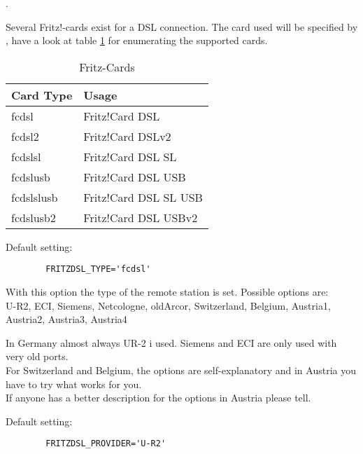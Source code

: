 \begin{description}
  
  .


Several Fritz!-cards exist for a DSL connection. 
The card used will be specified by
, have a look at table
\ref{tab:fritz-karten} for enumerating the supported cards.

\begin{table}[htb]
  \centering
  \begin{tabular}{l|l}
    Card Type & Usage \\
    \hline
    fcdsl & Fritz!Card DSL \\
    fcdsl2 & Fritz!Card DSLv2\\
    fcdslsl & Fritz!Card DSL SL\\
    fcdslusb & Fritz!Card DSL USB\\
    fcdslslusb & Fritz!Card DSL SL USB\\
    fcdslusb2 & Fritz!Card DSL USBv2
  \end{tabular}
  \caption{Fritz-Cards}
  \label{tab:fritz-karten}
\end{table}

        Default setting:

\begin{example}
\begin{verbatim}
        FRITZDSL_TYPE='fcdsl'
\end{verbatim}
\end{example}


With this option the type of the remote station is set. Possible options are:\\
U-R2, ECI, Siemens, Netcologne, oldArcor, Switzerland, Belgium, Austria1, Austria2, Austria3, Austria4

In Germany almost always UR-2 i used. Siemens and ECI are only used with very old ports.\\
For Switzerland and Belgium, the options are self-explanatory and in Austria you 
have to try what works for you.\\
If anyone has a better description for the options in Austria please tell.

        Default setting:

\begin{example}
\begin{verbatim}
        FRITZDSL_PROVIDER='U-R2'
\end{verbatim}
\end{example}

\end{description}

